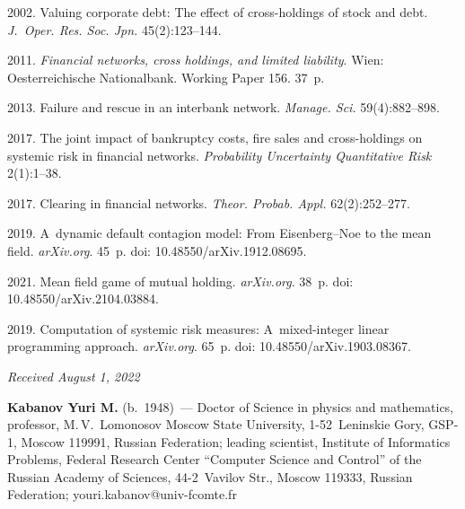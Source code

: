 \begin{multicols}{2}
{{\begin{thebibliography}{9}
 2002. Valuing corporate debt: The effect of cross-holdings of stock and debt. 
\textit{J.~Oper. Res. Soc. Jpn.} 45(2):123--144.

 2011. \textit{Financial networks, cross holdings, and limited liability}. 
Wien: Oesterreichische Nationalbank. Working Paper 156. 37~p.

 2013. Failure and rescue in an interbank network. 
\textit{Manage. Sci.} 59(4):882--898.

2017. The joint impact of bankruptcy costs, fire sales and cross-holdings on systemic risk in financial networks.
\textit{Probability Uncertainty Quantitative Risk} 2(1):1--38.

 2017. Clearing in financial networks. \textit{Theor. Probab. Appl.} 62(2):252--277.

 2019. A~dynamic default contagion model: From Eisenberg--Noe to the mean field.  \textit{arXiv.org}. 45~p. 
doi: 10.48550/arXiv.1912.08695.
  


 2021. Mean field game of mutual holding. \textit{arXiv.org}. 38~p. 
doi: 10.48550/arXiv.2104.03884.




 2019. Computation of systemic risk measures: 
A~mixed-integer linear programming approach. \textit{arXiv.org}. 65~p. doi: 10.48550/arXiv.1903.08367.
\end{thebibliography} } }

\end{multicols}

\vspace*{-6pt}

\hfill{\small\textit{Received August 1, 2022}}

\vspace*{-18pt}



\Contr


\noindent
\textbf{Kabanov Yuri M.} (b.\ 1948)~--- 
Doctor of Science in physics and mathematics, professor, M.\,V.~Lomonosov Moscow State University, 1-52~Leninskie Gory, 
GSP-1, Moscow 119991, Russian Federation; leading scientist, Institute of Informatics Problems, Federal Research Center 
``Computer Science and Control'' of the Russian Academy of Sciences, 44-2~Vavilov Str., Moscow 119333, Russian Federation; 
\mbox{youri.kabanov@univ-fcomte.fr}

